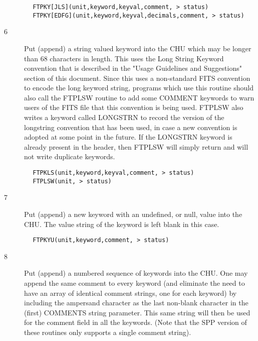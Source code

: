 \documentclass[11pt]{book}
\begin{document}
\begin{verbatim}
        FTPKY[JLS](unit,keyword,keyval,comment, > status)
        FTPKY[EDFG](unit,keyword,keyval,decimals,comment, > status)
\end{verbatim}

\begin{description}
\item[6 ] Put (append) a string valued keyword into the CHU which may be longer
    than 68 characters in length.  This uses the Long String Keyword
    convention that is described in the "Usage Guidelines and Suggestions"
    section of this document.  Since this uses a non-standard FITS
    convention to encode the long keyword string, programs which use
    this routine should also call the FTPLSW routine to add some COMMENT
    keywords to warn users of the FITS file that this convention is
    being used.  FTPLSW also writes a keyword called LONGSTRN to record
    the version of the longstring convention that has been used, in case
    a new convention is adopted at some point in the future.   If the
    LONGSTRN keyword is already present in the header, then FTPLSW will
   simply return and will not write duplicate keywords.
\end{description}

\begin{verbatim}
        FTPKLS(unit,keyword,keyval,comment, > status)
        FTPLSW(unit, > status)
\end{verbatim}

\begin{description}
\item[7 ] Put (append) a new keyword with an undefined, or null, value into the CHU.
   The value string of the keyword is left blank in this case.
\end{description}

\begin{verbatim}
        FTPKYU(unit,keyword,comment, > status)
\end{verbatim}

\begin{description}
\item[8 ] Put (append) a numbered sequence of keywords into the CHU.   One may
    append the same comment to every keyword (and eliminate the need
    to have an array of identical comment strings, one for each keyword) by
    including the ampersand character as the last non-blank character in the
    (first) COMMENTS string parameter.  This same string
    will then be used for the comment field in all the keywords. (Note
    that the SPP version of these routines only supports a single comment
   string).
\end{description}
\end{document}
